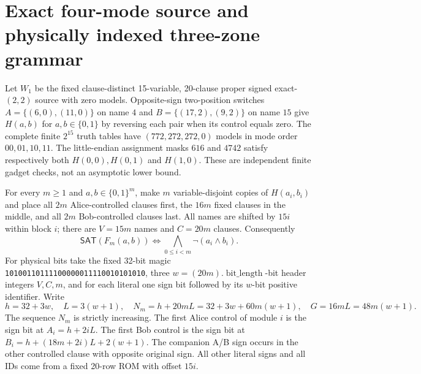 \documentclass[11pt]{article}
\newcommand{\SAT}{\mathsf{SAT}}
\begin{document}
\section{Exact four-mode source and physically indexed three-zone grammar}
Let $W_1$ be the fixed clause-distinct 15-variable, 20-clause
proper signed exact-$(2,2)$ source with zero models. Opposite-sign
two-position switches
$A=\{(6,0),(11,0)\}$ on name $4$ and
$B=\{(17,2),(9,2)\}$ on name $15$
give $H(a,b)$ for $a,b\in\{0,1\}$ by reversing each pair
when its control equals zero. The complete finite $2^{15}$
truth tables have $(772,272,272,0)$ models in mode order
$00,01,10,11$. The little-endian assignment masks $616$
and $4742$ satisfy respectively both $H(0,0),H(0,1)$
and $H(1,0)$. These are independent finite gadget checks,
not an asymptotic lower bound.

For every $m\ge1$ and $a,b\in\{0,1\}^m$, make $m$
variable-disjoint copies of $H(a_i,b_i)$ and place all
$2m$ Alice-controlled clauses first, the $16m$ fixed
clauses in the middle, and all $2m$ Bob-controlled
clauses last. All names are shifted by $15i$ within
block $i$; there are $V=15m$ names and $C=20m$ clauses.
Consequently
\[
 \SAT(F_m(a,b))\iff\bigwedge_{0\le i<m}\neg(a_i\land b_i).
 \tag{1}
\]
For physical bits take the fixed 32-bit magic
\texttt{10100110111100000011110010101010},
three $w=(20m).\operatorname{bit\_length}$-bit
header integers $V,C,m$, and for each literal one sign
bit followed by its $w$-bit positive identifier.
Write
\[
 h=32+3w,\quad L=3(w+1),\quad
 N_m=h+20mL=32+3w+60m(w+1),\quad
 G=16mL=48m(w+1).                                   \tag{2}
\]
The sequence $N_m$ is strictly increasing.
The first Alice control of module $i$ is the sign bit at
$A_i=h+2iL$. The first Bob control is the sign bit at
$B_i=h+(18m+2i)L+2(w+1)$.
The companion A/B sign occurs in the other controlled
clause with opposite original sign.
All other literal signs and all IDs come from a fixed
20-row ROM with offset $15i$.
\end{document}

